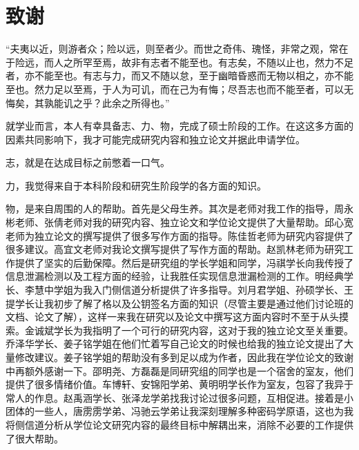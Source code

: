 \chapter[致谢]{致\quad 谢}%

“夫夷以近，则游者众；险以远，则至者少。而世之奇伟、瑰怪，非常之观，常在于险远，而人之所罕至焉，故非有志者不能至也。有志矣，不随以止也，然力不足者，亦不能至也。有志与力，而又不随以怠，至于幽暗昏惑而无物以相之，亦不能至也。然力足以至焉，于人为可讥，而在己为有悔；尽吾志也而不能至者，可以无悔矣，其孰能讥之乎？此余之所得也。”

就学业而言，本人有幸具备志、力、物，完成了硕士阶段的工作。在这这多方面的因素共同影响下，我才可能完成研究内容和独立论文并据此申请学位。

志，就是在达成目标之前憋着一口气。

力，我觉得来自于本科阶段和研究生阶段学的各方面的知识。

物，是来自周围的人的帮助。首先是父母生养。其次是老师对我工作的指导，周永彬老师、张倩老师对我的研究内容、独立论文和学位论文提供了大量帮助。邱心宽老师为独立论文的撰写提供了很多写作方面的指导。陈佳哲老师为研究内容提供了很多建议。高宜文老师对我论文撰写提供了写作方面的帮助。赵凯林老师为研究工作提供了坚实的后勤保障。然后是研究组的学长学姐和同学，冯祺学长向我传授了信息泄漏检测以及工程方面的经验，让我胜任实现信息泄漏检测的工作。明经典学长、李慧中学姐为我入门侧信道分析提供了许多指导。刘月君学姐、孙硕学长、王提学长让我初步了解了格以及公钥签名方面的知识（尽管主要是通过他们讨论班的文档、论文了解），这样一来我在研究以及论文中撰写这方面内容时不至于从头摸索。金诚斌学长为我指明了一个可行的研究内容，这对于我的独立论文至关重要。乔泽华学长、姜子铭学姐在他们忙着写自己论文的时候也给我的独立论文提出了大量修改建议。姜子铭学姐的帮助没有多到足以成为作者，因此我在学位论文的致谢中再额外感谢一下。邵明尧、方磊磊是同研究组的同学也是一个宿舍的室友，他们提供了很多情绪价值。车博轩、安锦阳学弟、黄明明学长作为室友，包容了我异于常人的作息。赵禹涵学长、张泽龙学弟找我讨论过很多问题，互相促进。接着是小团体的一些人，唐雳雳学弟、冯驰云学弟让我深刻理解多种密码学原语，这也为我将侧信道分析从学位论文研究内容的最终目标中解耦出来，消除不必要的工作提供了很大帮助。

